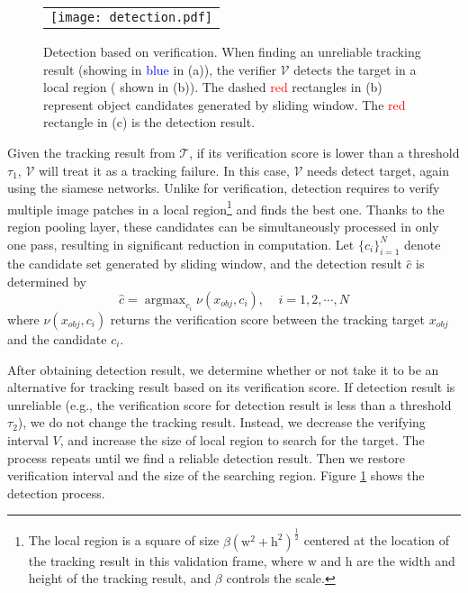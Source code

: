 \documentclass[10pt,twocolumn,letterpaper]{article}
\DeclareMathOperator*{\argmax}{argmax}
\def \TRK{\mathcal{T}}
\def \VF{\mathcal{V}}
\begin{document}
\begin{figure}[!t]
\centering
\begin{tabular}{@{}C{8.2cm}@{}}
\texttt{[image: detection.pdf]}\\
\end{tabular}
\caption{Detection based on verification. When finding an unreliable tracking result (showing in \textcolor{blue}{blue} in (a)), the verifier $\VF$ detects the target in a local region ( shown in (b)). The dashed \textcolor{red}{red} rectangles in (b) represent object candidates generated by sliding window. The \textcolor{red}{red} rectangle in (c) is the detection result.}
\label{detection}
\end{figure}

Given the tracking result from $\TRK$, if its verification score is lower than a threshold $\tau_{1}$, $\VF$ will treat it as a tracking failure. In this case, $\VF$ needs detect target, again using the siamese networks. Unlike for verification, detection requires to verify multiple image patches in a local region\footnote{The local region is a square of size $\beta(\mathrm{w}^{2}+\mathrm{h}^{2})^{\frac{1}{2}}$ centered at the location of the tracking result in this validation frame, where $\mathrm{w}$ and $\mathrm{h}$ are the width and height of the tracking result, and $\beta$ controls the scale.} and finds the best one. Thanks to the region pooling layer, these candidates can be simultaneously processed in only one pass, resulting in significant reduction in computation. Let $\{c_{i}\}_{i=1}^{N}$ denote the candidate set generated by sliding window, and the detection result $\widehat{c}$ is determined by
\begin{equation}
\widehat{c} = \argmax_{c_{i}}{\nu(x_{obj}, c_{i})}, \;\;\;\; i =1,2,\cdots,N
\end{equation}
where $\nu(x_{obj}, c_{i})$ returns the verification score between the tracking target $x_{obj}$ and the candidate $c_i$.

After obtaining detection result, we determine whether or not take it to be an alternative for tracking result based on its verification score. If detection result is unreliable (e.g., the verification score for detection result is less than a threshold $\tau_{2}$), we do not change the tracking result. Instead, we decrease the verifying interval $V$, and increase the size of local region to search for the target. The process repeats until we find a reliable detection result. Then we restore verification interval and the size of the searching region. Figure \ref{detection} shows the detection process.
\end{document}

